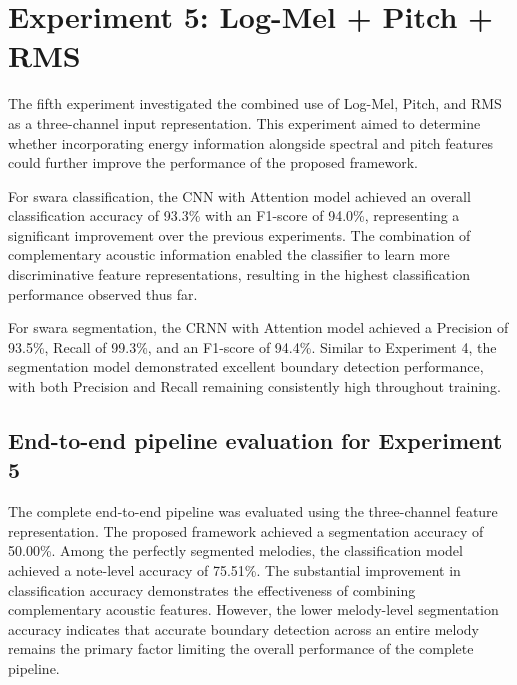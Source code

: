 
\section{Experiment 5: Log-Mel + Pitch + RMS}

The fifth experiment investigated the combined use of Log-Mel, Pitch, and RMS as a three-channel input representation. This experiment aimed to determine whether incorporating energy information alongside spectral and pitch features could further improve the performance of the proposed framework.

For swara classification, the CNN with Attention model achieved an overall classification accuracy of 93.3\% with an F1-score of 94.0\%, representing a significant improvement over the previous experiments. The combination of complementary acoustic information enabled the classifier to learn more discriminative feature representations, resulting in the highest classification performance observed thus far.


For swara segmentation, the CRNN with Attention model achieved a Precision of 93.5\%, Recall of 99.3\%, and an F1-score of 94.4\%. Similar to Experiment 4, the segmentation model demonstrated excellent boundary detection performance, with both Precision and Recall remaining consistently high throughout training.


\subsection*{End-to-end pipeline evaluation for Experiment 5}

The complete end-to-end pipeline was evaluated using the three-channel feature representation. The proposed framework achieved a segmentation accuracy of 50.00\%. Among the perfectly segmented melodies, the classification model achieved a note-level accuracy of 75.51\%. The substantial improvement in classification accuracy demonstrates the effectiveness of combining complementary acoustic features. However, the lower melody-level segmentation accuracy indicates that accurate boundary detection across an entire melody remains the primary factor limiting the overall performance of the complete pipeline.


